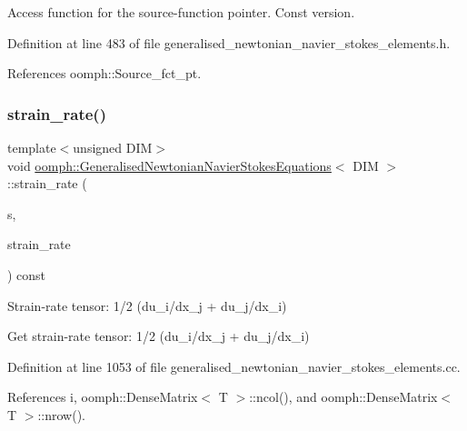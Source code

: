 Access function for the source-\/function pointer. Const version. 



Definition at line 483 of file generalised\+\_\+newtonian\+\_\+navier\+\_\+stokes\+\_\+elements.\+h.



References oomph\+::\+Source\+\_\+fct\+\_\+pt.

\mbox{\label{classoomph_1_1GeneralisedNewtonianNavierStokesEquations_a2ea3e797f3c7aceb7e3f12188746818c}} 
\subsubsection{\texorpdfstring{strain\+\_\+rate()}{strain\_rate()}\hspace{0.1cm}{\footnotesize\ttfamily [1/2]}}
{\footnotesize\ttfamily template$<$unsigned D\+IM$>$ \\
void \hyperlink{classoomph_1_1GeneralisedNewtonianNavierStokesEquations}{oomph\+::\+Generalised\+Newtonian\+Navier\+Stokes\+Equations}$<$ D\+IM $>$\+::strain\+\_\+rate (\begin{DoxyParamCaption}\item[{const \hyperlink{classoomph_1_1Vector}{Vector}$<$ double $>$ \&}]{s,  }\item[{\hyperlink{classoomph_1_1DenseMatrix}{Dense\+Matrix}$<$ double $>$ \&}]{strain\+\_\+rate }\end{DoxyParamCaption}) const}



Strain-\/rate tensor\+: 1/2 (du\+\_\+i/dx\+\_\+j + du\+\_\+j/dx\+\_\+i) 

Get strain-\/rate tensor\+: 1/2 (du\+\_\+i/dx\+\_\+j + du\+\_\+j/dx\+\_\+i) 

Definition at line 1053 of file generalised\+\_\+newtonian\+\_\+navier\+\_\+stokes\+\_\+elements.\+cc.



References i, oomph\+::\+Dense\+Matrix$<$ T $>$\+::ncol(), and oomph\+::\+Dense\+Matrix$<$ T $>$\+::nrow().



